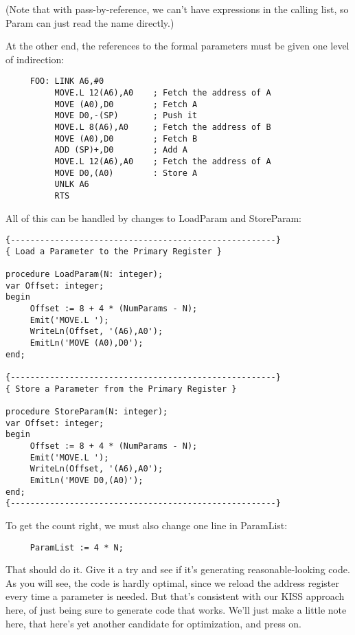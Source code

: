 (Note that with pass-by-reference, we can't  have  expressions in the calling list, so Param can just read the name directly.)

At the other end, the references to the formal parameters must be given one level of indirection:

\begin{verbatim}
     FOO: LINK A6,#0
          MOVE.L 12(A6),A0    ; Fetch the address of A
          MOVE (A0),D0        ; Fetch A
          MOVE D0,-(SP)       ; Push it
          MOVE.L 8(A6),A0     ; Fetch the address of B
          MOVE (A0),D0        ; Fetch B
          ADD (SP)+,D0        ; Add A
          MOVE.L 12(A6),A0    ; Fetch the address of A
          MOVE D0,(A0)        : Store A
          UNLK A6
          RTS
\end{verbatim}

All  of  this  can  be   handled  by  changes  to  LoadParam  and StoreParam:

\begin{verbatim}
{------------------------------------------------------}
{ Load a Parameter to the Primary Register }

procedure LoadParam(N: integer);
var Offset: integer;
begin
     Offset := 8 + 4 * (NumParams - N);
     Emit('MOVE.L ');
     WriteLn(Offset, '(A6),A0');
     EmitLn('MOVE (A0),D0');
end;

{------------------------------------------------------}
{ Store a Parameter from the Primary Register }

procedure StoreParam(N: integer);
var Offset: integer;
begin
     Offset := 8 + 4 * (NumParams - N);
     Emit('MOVE.L ');
     WriteLn(Offset, '(A6),A0');
     EmitLn('MOVE D0,(A0)');
end;
{------------------------------------------------------}
\end{verbatim}

To  get  the  count  right, we  must  also  change  one line  in ParamList:

\begin{verbatim}
     ParamList := 4 * N;
\end{verbatim}

That  should  do it. Give it a try and see  if  it's  generating reasonable-looking code. As  you  will  see, the code is hardly optimal, since  we  reload  the  address register every  time  a parameter  is  needed. But  that's  consistent  with our  KISS approach  here, of  just being sure to generate code that works. We'll  just  make  a  little  note here, that here's yet  another candidate for optimization, and press on.

